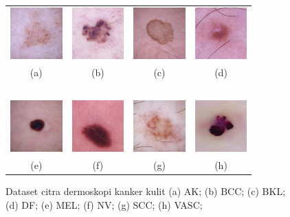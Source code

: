 \begin{figure}[H]
    \centering
    \begin{tabular}{cccc}
        \includegraphics[width=2cm]{img/bab3/ak.png}
        &
        \includegraphics[width=2cm]{img/bab3/bcc.png}
        &
        \includegraphics[width=2cm]{img/bab3/bkl.png}
        &
        \includegraphics[width=2cm]{img/bab3/df.png}\\
        (a) &(b) &(c) &(d)\\
        \  &\  &\  &\ \\
        \includegraphics[width=2cm]{img/bab3/mel.png}
        &
        \includegraphics[width=2cm]{img/bab3/nv.png}
        &
        \includegraphics[width=2cm]{img/bab3/scc.png}
        &
        \includegraphics[width=2cm]{img/bab3/vasc.png}\\
        (e) &(f) &(g) &(h)\\
    \end{tabular}
    \caption{Dataset citra dermoskopi kanker kulit (a) AK; (b) BCC; (c) BKL; (d) DF; (e) MEL; (f) NV; (g) SCC; (h) VASC;}
    \label{fig:dataset}
\end{figure}


